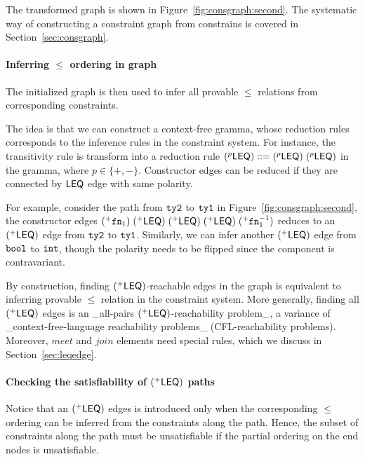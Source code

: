 The transformed graph is shown in Figure~\ref{fig:consgraph:second}. The
systematic way of constructing a constraint graph from constrains is covered in
Section~\ref{sec:consgraph}.

\paragraph{Inferring $\leq$ ordering in graph}

The initialized graph is then used to infer all provable $\leq$
relations from corresponding constraints.

The idea is that we can construct a context-free gramma, whose reduction
rules corresponds to the inference rules in the constraint system. For
instance, the transitivity rule is transform into a reduction rule
$(^{p}\mathsf{LEQ}) ::= (^{p}\mathsf{LEQ})\; (^{p}\mathsf{LEQ})$ in
the gramma, where $p\in \{+,-\}$. Constructor edges can be reduced
if they are connected by $\mathsf{LEQ}$ edge with same polarity.

For example, consider the path from $\mathtt{ty2}$ to $\mathtt{ty1}$ in
Figure~\ref{fig:consgraph:second}, the constructor edges
$(^{+}\mathtt{fn}_1)\; (^{+}\mathsf{LEQ})\; (^{+}\mathsf{LEQ})\;
(^{+}\mathsf{LEQ})\; (^{+}\mathtt{fn}_1^{-1})$ reduces to an
$(^{+}\mathsf{LEQ})$ edge from $\mathtt{ty2}$ to $\mathtt{ty1}$.
Similarly, we can infer another $(^{+}\mathsf{LEQ})$ edge from
$\mathtt{bool}$ to $\mathtt{int}$, though the polarity needs to be flipped
since the component is contravariant.

By construction, finding $(^{+}\mathsf{LEQ})$-reachable edges in the
graph is equivalent to inferring provable $\leq$ relation in the
constraint system. More generally, finding all $(^{+}\mathsf{LEQ})$
edges is an _all-pairs $(^{+}\mathsf{LEQ})$-reachability problem_, a variance
of _context-free-language reachability problems_ (CFL-reachability
problems). Moreover, $meet$ and $join$ elements need special rules,
which we discuss in Section~\ref{sec:leqedge}.

\paragraph{Checking the satisfiability of $(^{+}\mathsf{LEQ})$ paths}

Notice that an $(^{+}\mathsf{LEQ})$ edges is introduced only when the
corresponding $\leq$ ordering can be inferred from the constraints
along the path. Hence, the subset of constraints along the path must
be unsatisfiable if the partial ordering on the end nodes is
unsatisfiable.

